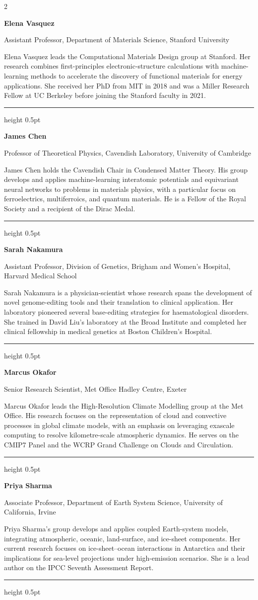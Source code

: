 \documentclass[a4paper,11pt]{article}
\newcommand{\contributor}[3]{%
  \begin{minipage}[t]{\linewidth}
    \vspace{6pt}
    {\sffamily\bfseries\color{accent}#1}\par
    {\sffamily\footnotesize\color{graytext}#2}\par
    \vspace{3pt}
    {\small#3\par}
    \vspace{2pt}
    {\color{bioline}\hrule height 0.5pt}
  \end{minipage}
  \medskip
}
\begin{document}
\begin{multicols}{2}

\contributor{Elena Vasquez}
{Assistant Professor, Department of Materials Science, Stanford University}
{Elena Vasquez leads the Computational Materials Design group at Stanford. Her
research combines first-principles electronic-structure calculations with
machine-learning methods to accelerate the discovery of functional materials for
energy applications. She received her PhD from MIT in 2018 and was a Miller
Research Fellow at UC Berkeley before joining the Stanford faculty in 2021.}

\contributor{James Chen}
{Professor of Theoretical Physics, Cavendish Laboratory, University of
Cambridge}
{James Chen holds the Cavendish Chair in Condensed Matter Theory. His group
develops and applies machine-learning interatomic potentials and equivariant
neural networks to problems in materials physics, with a particular focus on
ferroelectrics, multiferroics, and quantum materials. He is a Fellow of the
Royal Society and a recipient of the Dirac Medal.}

\contributor{Sarah Nakamura}
{Assistant Professor, Division of Genetics, Brigham and Women's Hospital,
Harvard Medical School}
{Sarah Nakamura is a physician-scientist whose research spans the development of
novel genome-editing tools and their translation to clinical application. Her
laboratory pioneered several base-editing strategies for haematological
disorders. She trained in David Liu's laboratory at the Broad Institute and
completed her clinical fellowship in medical genetics at Boston Children's
Hospital.}

\contributor{Marcus Okafor}
{Senior Research Scientist, Met Office Hadley Centre, Exeter}
{Marcus Okafor leads the High-Resolution Climate Modelling group at the Met
Office. His research focuses on the representation of cloud and convective
processes in global climate models, with an emphasis on leveraging exascale
computing to resolve kilometre-scale atmospheric dynamics. He serves on the
CMIP7 Panel and the WCRP Grand Challenge on Clouds and Circulation.}

\contributor{Priya Sharma}
{Associate Professor, Department of Earth System Science, University of
California, Irvine}
{Priya Sharma's group develops and applies coupled Earth-system models,
integrating atmospheric, oceanic, land-surface, and ice-sheet components. Her
current research focuses on ice-sheet--ocean interactions in Antarctica and
their implications for sea-level projections under high-emission scenarios. She
is a lead author on the IPCC Seventh Assessment Report.}

\end{multicols}
\end{document}
